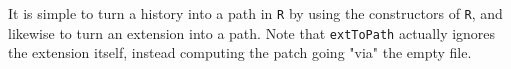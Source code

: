 It is simple to turn a history into a path in \texttt{R} by using the constructors of \texttt{R},
and likewise to turn an extension into a path.
Note that \texttt{extToPath} actually ignores the extension
itself, instead computing the patch going "via" the empty file.
\begin{code}%
\>[0]\AgdaSpace{}%
\AgdaSymbol{:}\AgdaSpace{}%
\AgdaSymbol{\{}\AgdaSpace{}%
\AgdaSymbol{:}\AgdaSpace{}%
\AgdaSymbol{\}}\AgdaSpace{}%
\AgdaSymbol{(}\AgdaSpace{}%
\AgdaSymbol{:}\AgdaSpace{}%
\AgdaSpace{}%
\AgdaSpace{}%
\AgdaSymbol{)}\AgdaSpace{}%
\AgdaSpace{}%
\AgdaSpace{}%
\AgdaInductiveConstructor{[]}\AgdaSpace{}%
\AgdaSpace{}%
\AgdaSpace{}%
\<%
\\
\>[0]\AgdaSpace{}%
\AgdaInductiveConstructor{[]}\AgdaSpace{}%
\AgdaSymbol{=}\AgdaSpace{}%
\<%
\\
\>[0]\AgdaSpace{}%
\AgdaSymbol{(}\AgdaSpace{}%
\AgdaSpace{}%
\AgdaSpace{}%
\AgdaSpace{}%
\AgdaOperator{\AgdaInductiveConstructor{::}}\AgdaSpace{}%
\AgdaSymbol{)}\AgdaSpace{}%
\AgdaSymbol{=}\AgdaSpace{}%
\AgdaSymbol{(}\AgdaSpace{}%
\AgdaSymbol{)}\AgdaSpace{}%
\AgdaSpace{}%
\AgdaSpace{}%
\AgdaSpace{}%
\AgdaSpace{}%
\<%
\\
\>[0]\AgdaSpace{}%
\AgdaSymbol{(}\AgdaSpace{}%
\AgdaSpace{}%
\AgdaOperator{\AgdaInductiveConstructor{::}}\AgdaSpace{}%
\AgdaSymbol{)}\AgdaSpace{}%
\AgdaSymbol{=}\AgdaSpace{}%
\AgdaSymbol{(}\AgdaSpace{}%
\AgdaSymbol{)}\AgdaSpace{}%
\AgdaSpace{}%
\AgdaSpace{}%
\AgdaSpace{}%
\<%
\\
%
\\[\AgdaEmptyExtraSkip]%
\>[0]\AgdaSpace{}%
\AgdaSymbol{:}%
\>[748I]\AgdaSymbol{\{}\AgdaSpace{}%
\AgdaSpace{}%
\AgdaSymbol{:}\AgdaSpace{}%
\AgdaSymbol{\}}\AgdaSpace{}%
\AgdaSymbol{\{}\AgdaSpace{}%

\end{code}
